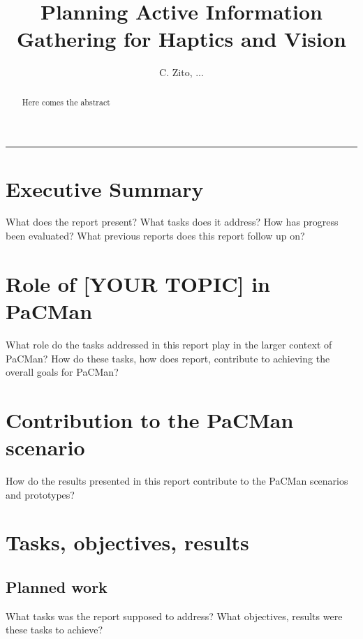 \documentclass[a4paper,11pt,pdf]{pacmanreport}
\title{Planning Active Information Gathering for Haptics and Vision}
\author{C. Zito, ...}
\begin{document}
\maketitle

\begin{abstract}
\noindent Here comes the abstract
\end{abstract}


\vspace{.2em}
\hrule

\footnotesize

\tableofcontents

\normalsize

\newpage

\section*{Executive Summary}

What does the report present? What tasks does it address? How has progress been evaluated? What previous reports does this report follow up on? 

\section*{Role of [YOUR TOPIC] in PaCMan}

What role do the tasks addressed in this report play in the larger context of PaCMan? How do these tasks, how does report, contribute to achieving the overall goals for PaCMan? 

\section*{Contribution to the PaCMan scenario}

How do the results presented in this report contribute to the PaCMan\cite{ProjectWebsite} scenarios and prototypes? 


\newpage

\section{Tasks, objectives, results}

\subsection{Planned work}

What tasks was the report supposed to address? What objectives, results were these tasks to achieve? 
\end{document}
